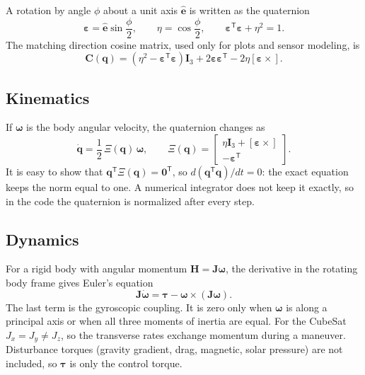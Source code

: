 \documentclass[letterpaper,10pt]{article}
\newcommand{\vv}[1]{\bm{#1}}
\newcommand{\Tp}{^{\mathsf{T}}}
\begin{document}
A rotation by angle $\phi$ about a unit axis $\hat{\vv{e}}$ is written as the
quaternion
\begin{equation}
  \vv{\varepsilon} = \hat{\vv{e}}\sin\frac{\phi}{2}, \qquad \eta = \cos\frac{\phi}{2},
  \qquad \vv{\varepsilon}\Tp\vv{\varepsilon} + \eta^2 = 1 .
  \label{eq:quat}
\end{equation}
The matching direction cosine matrix, used only for plots and sensor
modeling, is
\begin{equation}
  \vv{C}(\vv{q}) = (\eta^2 - \vv{\varepsilon}\Tp\vv{\varepsilon})\vv{I}_3
  + 2\vv{\varepsilon}\vv{\varepsilon}\Tp - 2\eta[\vv{\varepsilon}\times].
\end{equation}

\subsection{Kinematics}

If $\vv{\omega}$ is the body angular velocity, the quaternion changes as
\cite{markley}
\begin{equation}
  \dot{\vv{q}} = \frac{1}{2}\,\Xi(\vv{q})\,\vv{\omega}, \qquad
  \Xi(\vv{q}) = \begin{bmatrix} \eta\vv{I}_3 + [\vv{\varepsilon}\times] \\ -\vv{\varepsilon}\Tp \end{bmatrix}.
  \label{eq:kin}
\end{equation}
It is easy to show that $\vv{q}\Tp\Xi(\vv{q}) = \vv{0}\Tp$, so
$d(\vv{q}\Tp\vv{q})/dt = 0$: the exact equation keeps the norm equal to one.
A numerical integrator does not keep it exactly, so in the code the
quaternion is normalized after every step.

\subsection{Dynamics}

For a rigid body with angular momentum $\vv{H} = \vv{J}\vv{\omega}$, the
derivative in the rotating body frame gives Euler's equation \cite{hughes}
\begin{equation}
  \vv{J}\dot{\vv{\omega}} = \vv{\tau} - \vv{\omega}\times(\vv{J}\vv{\omega}).
  \label{eq:euler}
\end{equation}
The last term is the gyroscopic coupling. It is zero only when $\vv{\omega}$
is along a principal axis or when all three moments of inertia are equal. For
the CubeSat $J_x = J_y \ne J_z$, so the transverse rates exchange momentum
during a maneuver. Disturbance torques (gravity gradient, drag, magnetic,
solar pressure) are not included, so $\vv{\tau}$ is only the control torque.
\end{document}
